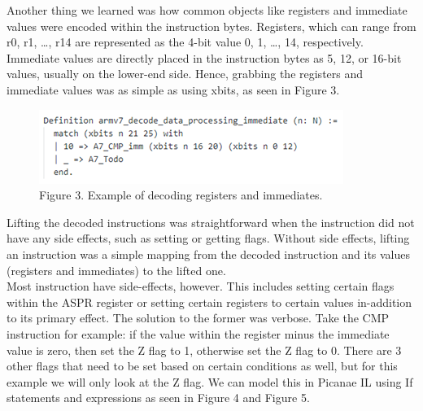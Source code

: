 \documentclass[twocolumn]{article}
\begin{document}
Another thing we learned was how common objects like registers and immediate values were encoded within the instruction bytes. Registers, which can range from r0, r1, …, r14 are represented as the 4-bit value 0, 1, …, 14, respectively. Immediate values are directly placed in the instruction bytes as 5, 12, or 16-bit values, usually on the lower-end side. Hence, grabbing the registers and immediate values was as simple as using xbits, as seen in Figure 3.\\

\begin{figure}[H]
\includegraphics[width=\linewidth]{decode_immediate_example.png}\\
Figure 3. Example of decoding registers and immediates.
\centering
\end{figure}

Lifting the decoded instructions was straightforward when the instruction did not have any side effects, such as setting or getting flags. Without side effects, lifting an instruction was a simple mapping from the decoded instruction and its values (registers and immediates) to the lifted one.\\

Most instruction have side-effects, however. This includes setting certain flags within the ASPR register or setting certain registers to certain values in-addition to its primary effect. The solution to the former was verbose. Take the CMP instruction for example: if the value within the register minus the immediate value is zero, then set the Z flag to 1, otherwise set the Z flag to 0. There are 3 other flags that need to be set based on certain conditions as well, but for this example we will only look at the Z flag. We can model this in Picanae IL using If statements and expressions as seen in Figure 4 and Figure 5.\\
\end{document}
